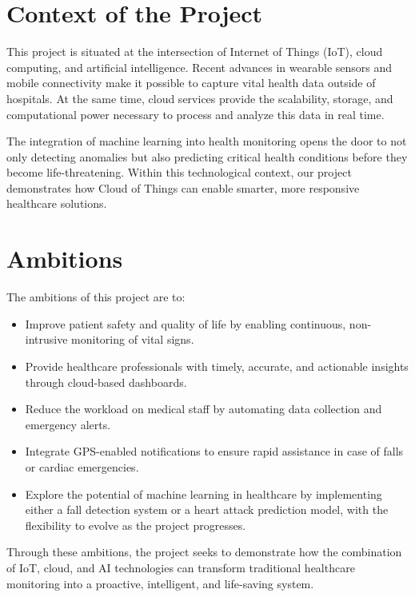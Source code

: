 \section{Context of the Project}

This project is situated at the intersection of Internet of Things (IoT), 
cloud computing, and artificial intelligence. 
Recent advances in wearable sensors and mobile connectivity make it possible 
to capture vital health data outside of hospitals. 
At the same time, cloud services provide the scalability, storage, and computational power 
necessary to process and analyze this data in real time. 

The integration of machine learning into health monitoring opens the door 
to not only detecting anomalies but also predicting critical health conditions 
before they become life-threatening. 
Within this technological context, our project demonstrates how Cloud of Things 
can enable smarter, more responsive healthcare solutions.

\section{Ambitions}

The ambitions of this project are to:
\begin{itemize}
    \item Improve patient safety and quality of life by enabling continuous, non-intrusive monitoring of vital signs.
    \item Provide healthcare professionals with timely, accurate, and actionable insights through cloud-based dashboards.
    \item Reduce the workload on medical staff by automating data collection and emergency alerts.
    \item Integrate GPS-enabled notifications to ensure rapid assistance in case of falls or cardiac emergencies.
    \item Explore the potential of machine learning in healthcare by implementing either a fall detection system 
    or a heart attack prediction model, with the flexibility to evolve as the project progresses.
\end{itemize}

Through these ambitions, the project seeks to demonstrate how the combination of IoT, cloud, 
and AI technologies can transform traditional healthcare monitoring into a proactive, 
intelligent, and life-saving system.
